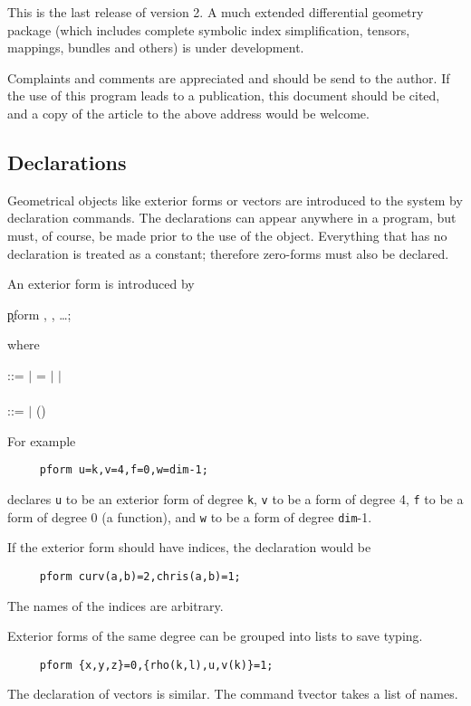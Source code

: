 This is the last release of version 2. A much extended differential
geometry package (which includes complete symbolic index simplification,
tensors, mappings, bundles and others) is under development.

Complaints and comments are appreciated and should be send to the author.
If the use of this program leads to a publication, this document should
be cited, and a copy of the article to the above address would be
welcome.

\subsection{Declarations}

Geometrical objects like exterior forms or vectors are introduced to the
system by declaration commands.  The declarations can appear anywhere in
a program, but must, of course, be made prior to the use of the object.
Everything that has no declaration is treated as a constant; therefore
zero-forms must also be declared.

An exterior form is introduced by\label{PFORM} 
\hypertarget{command:PFORM}{}

\hspace*{2em} \k{pform} , , \ldots;

where
\begin{flushleft}
 ::=  $\mid$ = $\mid$   $\mid$ \\
 \\
 ::=  $\mid$ ()
\end{flushleft}

For example
\begin{verbatim}
     pform u=k,v=4,f=0,w=dim-1;
\end{verbatim}
declares \texttt{u} to be an exterior form of degree \texttt{k}, \texttt{v} to be a
form of degree 4, \texttt{f} to be a form of degree 0 (a function), and \texttt{w}
to be a form of degree \texttt{dim}-1.

If the exterior form should have indices, the declaration would be
\begin{verbatim}
     pform curv(a,b)=2,chris(a,b)=1;
\end{verbatim}
The names of the indices are arbitrary.

Exterior forms of the same degree can be grouped into lists to save typing.
\begin{verbatim}
     pform {x,y,z}=0,{rho(k,l),u,v(k)}=1;
\end{verbatim}
The declaration of vectors is similar. The command \f{tvector}\label{TVECTOR}
takes a list of names.  
\hypertarget{command:TVECTOR}{}

